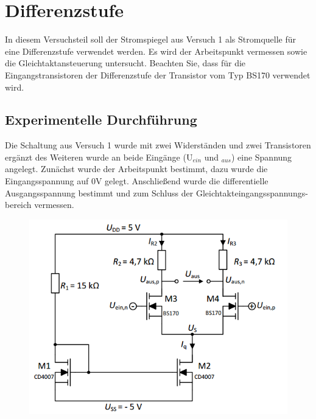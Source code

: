 \section{Differenzstufe}
In diesem Versuchsteil soll der Stromspiegel aus Versuch 1 als Stromquelle f\"ur eine
Differenzstufe verwendet werden. Es wird der Arbeitspunkt vermessen sowie die
Gleichtaktansteuerung untersucht.
Beachten Sie, dass f\"ur die Eingangstransistoren der Differenzstufe der Transistor
vom Typ BS170 verwendet wird.
\subsection{Experimentelle Durchf\"uhrung}
Die Schaltung aus Versuch 1 wurde mit zwei Widerst\"anden und zwei
Transistoren erg\"anzt des Weiteren wurde an beide Eing\"ange (U$_{ein}$ und 
$_{aus}$) eine Spannung angelegt. Zun\"achst wurde der Arbeitspunkt bestimmt,
dazu wurde die Eingangsspannung auf 0V gelegt. Anschlie\ss end wurde die
differentielle
Ausgangsspannung bestimmt und zum Schluss der Gleichtakteingangsspannungs-
bereich vermessen.
\begin{figure}[!ht]
\begin{center}
\includegraphics[scale=0.8]{Differenzstufe}
\end{center}
\end{figure}
\clearpage
